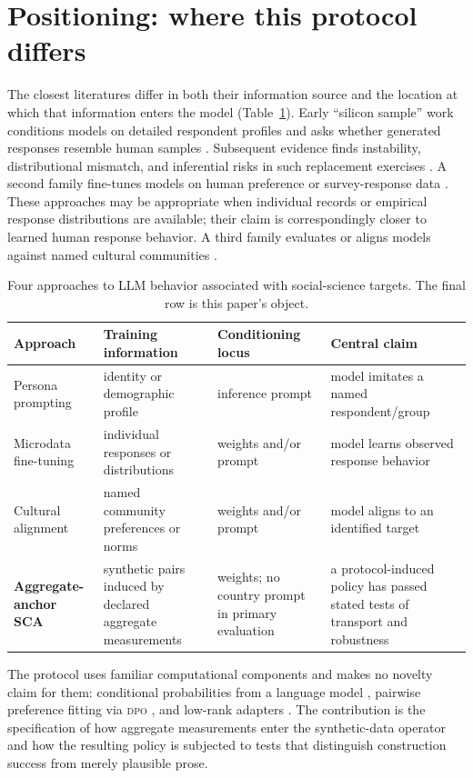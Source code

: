 \documentclass[10pt,letterpaper]{article}
\newcommand{\DPO}{\textsc{dpo}}
\begin{document}
\section{Positioning: where this protocol differs}
The closest literatures differ in both their information source and the location at which that information enters the model (Table~\ref{tab:positioning}). Early ``silicon sample'' work conditions models on detailed respondent profiles and asks whether generated responses resemble human samples \cite{argyle2023,abels2026,capra2025}. Subsequent evidence finds instability, distributional mismatch, and inferential risks in such replacement exercises \cite{bisbee2024,boelaert2025,dalloul2026}. A second family fine-tunes models on human preference or survey-response data \cite{suh2025,krsteski2026,cao2025}. These approaches may be appropriate when individual records or empirical response distributions are available; their claim is correspondingly closer to learned human response behavior. A third family evaluates or aligns models against named cultural communities \cite{tao2024}.

\begin{table}[H]
\centering\small
\caption{Four approaches to LLM behavior associated with social-science targets. The final row is this paper's object.}\label{tab:positioning}
\begin{tabularx}{\textwidth}{@{}p{2.45cm}p{2.3cm}p{2cm}X@{}}
\toprule
\textbf{Approach} & \textbf{Training information} & \textbf{Conditioning locus} & \textbf{Central claim}\\
\midrule
Persona prompting & identity or demographic profile & inference prompt & model imitates a named respondent/group\\
Microdata fine-tuning & individual responses or distributions & weights and/or prompt & model learns observed response behavior\\
Cultural alignment & named community preferences or norms & weights and/or prompt & model aligns to an identified target\\
\textbf{Aggregate-anchor SCA} & synthetic pairs induced by declared aggregate measurements & weights; no country prompt in primary evaluation & a protocol-induced policy has passed stated tests of transport and robustness\\
\bottomrule
\end{tabularx}
\end{table}

The protocol uses familiar computational components and makes no novelty claim for them: conditional probabilities from a language model \cite{ludwig2026}, pairwise preference fitting via \DPO{} \cite{rafailov2023}, and low-rank adapters \cite{hu2022,dettmers2023}. The contribution is the specification of how aggregate measurements enter the synthetic-data operator and how the resulting policy is subjected to tests that distinguish construction success from merely plausible prose.
\end{document}
